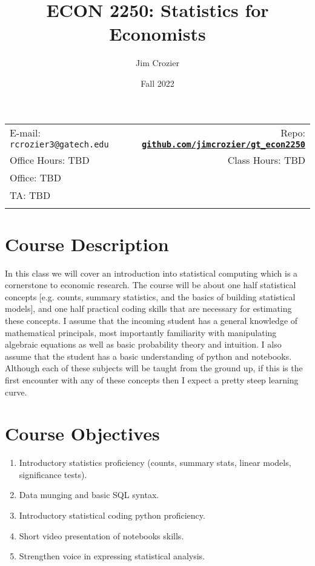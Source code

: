 \documentclass[11pt]{article}
\title{ECON 2250: Statistics for Economists}
\author{Jim Crozier}
\date{Fall 2022}
\newcommand{\blankline}{\quad\pagebreak[2]}
\begin{document}
\maketitle

\blankline

\begin{tabular*}{.93\textwidth}{@{\extracolsep{\fill}}lr}


  E-mail: \texttt{rcrozier3@gatech.edu} & Repo: \href{http://github.com/jimcrozier/gt\_econ2250}{\tt\bf github.com/jimcrozier/gt\_econ2250}  \\

Office Hours: TBD  &  Class Hours: TBD \\


Office: TBD \\
TA: TBD \\
&  \\
\hline
\end{tabular*}

\vspace{10 mm}

\section*{Course Description}

In this class we will cover an introduction into statistical computing which is a cornerstone to economic research. The course will be about one half statistical concepts [e.g. counts, summary statistics, and the basics of building statistical models], and one half practical coding skills that are necessary for estimating these concepts. I assume that the incoming student has a general knowledge of mathematical principals, most importantly familiarity with manipulating algebraic equations as well as basic probability theory and intuition. I also assume that the student has a basic understanding of python and notebooks. Although each of these subjects will be taught from the ground up, if this is the first encounter with any of these concepts then I expect a pretty steep learning curve. 


\section*{Course Objectives}
\begin{enumerate}
\item Introductory statistics proficiency (counts, summary stats, linear models, significance tests).
\item Data munging and basic SQL syntax. 
\item Introductory statistical coding python proficiency.
\item Short video presentation of notebooks skills.
\item Strengthen voice in expressing statistical analysis. 
\end{enumerate}
\end{document}
